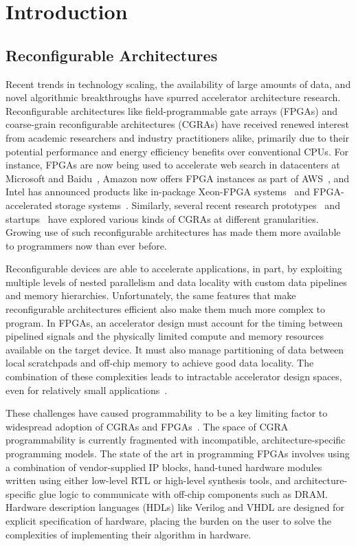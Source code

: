 \chapter{Introduction}
\label{intro}

\section{Reconfigurable Architectures}
Recent trends in technology scaling, the availability of large amounts of data,
and novel algorithmic breakthroughs have spurred accelerator architecture
research. Reconfigurable architectures like field-programmable gate arrays
(FPGAs) and coarse-grain reconfigurable architectures (CGRAs) have received
renewed interest from academic researchers and industry practitioners alike,
primarily due to their potential performance and energy efficiency benefits over
conventional CPUs. For instance, FPGAs are now being used to accelerate web search
in datacenters at Microsoft and Baidu~\cite{catapult, baidu},
Amazon now offers FPGA instances as part of AWS~\cite{awsf1},
and Intel has announced products like in-package Xeon-FPGA systems~\cite{harp}
and FPGA-accelerated storage systems~\cite{nand_flash}.
Similarly, several recent research prototypes~\cite{dyser, ti, scaledeep, scnn, plasticine}
and startups~\cite{wavecomp, nervana} have explored various
kinds of CGRAs at different granularities.
Growing use of such reconfigurable architectures has made them more available to programmers now than ever before.

Reconfigurable devices are able to accelerate applications, in part, by exploiting multiple
levels of nested parallelism and data locality with custom data pipelines and memory hierarchies.
Unfortunately, the same features that make reconfigurable architectures efficient
also make them much more complex to program. In FPGAs, an accelerator design
must account for the timing between pipelined signals and the physically limited
compute and memory resources available on the target device.
It must also manage partitioning of data between local scratchpads and off-chip memory to achieve good data locality.
The combination of these complexities leads to intractable accelerator design spaces, even for relatively small applications~\cite{cascaval}.

These challenges have caused programmability to be a key limiting factor to widespread adoption of CGRAs and FPGAs~\cite{fpgaMasses,DeSutter2013}.
The space of CGRA programmability is currently fragmented with incompatible, architecture-specific programming models.
The state of the art in programming FPGAs involves using a combination of vendor-supplied IP blocks,
hand-tuned hardware modules written using either low-level RTL or high-level synthesis tools,
and architecture-specific glue logic to communicate with off-chip components such as DRAM.
Hardware description languages (HDLs) like Verilog and VHDL are designed for explicit specification of hardware,
placing the burden on the user to solve the complexities of implementing their algorithm in hardware.

